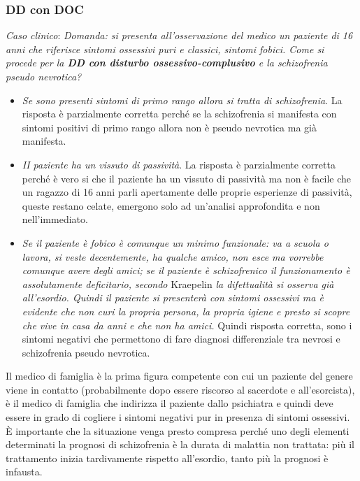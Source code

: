 \subsubsection{DD con DOC}

\emph{Caso clinico}: \emph{Domanda: si presenta all'osservazione del
medico un paziente di 16 anni che riferisce sintomi ossessivi puri e
classici, sintomi fobici. Come si procede per la \textbf{\emph{DD con
disturbo ossessivo-complusivo}} e la schizofrenia pseudo nevrotica? }

\begin{itemize}
\item
  \emph{Se sono presenti sintomi di primo rango allora si tratta di
  schizofrenia}. La risposta è parzialmente corretta perché se la
  schizofrenia si manifesta con sintomi positivi di primo rango allora
  non è pseudo nevrotica ma già manifesta.
\item
  \emph{II paziente ha un vissuto di passività}. La risposta è
  parzialmente corretta perché è vero si che il paziente ha un vissuto
  di passività ma non è facile che un ragazzo di 16 anni parli
  apertamente delle proprie esperienze di passività, queste restano
  celate, emergono solo ad un'analisi approfondita e non nell'immediato.
\item
  \emph{Se il paziente è fobico è comunque un minimo funzionale: va a
  scuola o lavora, si veste decentemente, ha qualche amico, non esce ma
  vorrebbe comunque avere degli amici; se il paziente è schizofrenico il
  funzionamento è assolutamente deficitario, secondo} Kraepelin \emph{la
  difettualità si osserva già all'esordio. Quindi il paziente si
  presenterà con sintomi ossessivi ma è evidente che non curi la propria
  persona, la propria igiene e presto si scopre che vive in casa da anni
  e che non ha amici.} Quindi risposta corretta, sono i sintomi negativi
  che permettono di fare diagnosi differenziale tra nevrosi e
  schizofrenia pseudo nevrotica.
\end{itemize}

Il medico di famiglia è la prima figura competente con cui un paziente
del genere viene in contatto (probabilmente dopo essere riscorso al
sacerdote e all'esorcista), è il medico di famiglia che indirizza il
paziente dallo psichiatra e quindi deve essere in grado di cogliere i
sintomi negativi pur in presenza di sintomi ossessivi. È importante che
la situazione venga presto compresa perché uno degli elementi
determinati la prognosi di schizofrenia è la durata di malattia non
trattata: più il trattamento inizia tardivamente rispetto all'esordio,
tanto più la prognosi è infausta.

